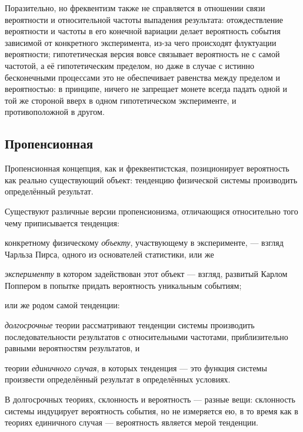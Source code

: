 \documentclass[14pt]{extarticle}
\begin{document}
Поразительно, но фреквентизм также не справляется в отношении связи вероятности и относительной частоты выпадения результата: отождествление вероятности и частоты в его конечной вариации делает вероятность события зависимой от конкретного эксперимента, из-за чего происходят флуктуации вероятности; гипотетическая версия вовсе связывает вероятность не с самой частотой, а её гипотетическим пределом, но даже в случае с истинно бесконечными процессами это не обеспечивает равенства между пределом и вероятностью: в принципе, ничего не запрещает монете всегда падать одной и той же стороной вверх в одном гипотетическом эксперименте, и противоположной в другом.


\subsection{Пропенсионная}

Пропенсионная концепция, как и фреквентистская, позиционирует вероятность как реально существующий объект: тенденцию физической системы производить определённый результат.

Существуют различные версии пропенсионизма, отличающися относительно того чему приписывается тенденция: 
\begin{inparaenum}[1)]
\item конкретному физическому \emph{объекту}, участвующему в эксперименте, --- взгляд Чарльза Пирса, одного из основателей статистики, или же
\item \emph{эксперименту} в котором задействован этот объект --- взгляд, развитый Карлом Поппером в попытке придать вероятность уникальным событиям;
\end{inparaenum}
или же родом самой тенденции:
\begin{inparaenum}[1)]
\item \emph{долгосрочные} теории рассматривают тенденции системы производить последовательности результатов с относительными частотами, приблизительно равными вероятностям результатов, и 
\item теории \emph{единичного случая}, в которых тенденция --- это функция системы произвести определённый результат в определённых условиях. 
\end{inparaenum}

В долгосрочных теориях, склонность и вероятность --- разные вещи: склонность системы индуцирует вероятность события, но не измеряется ею, в то время как в теориях единичного случая --- вероятность является мерой тенденции.
\end{document}
